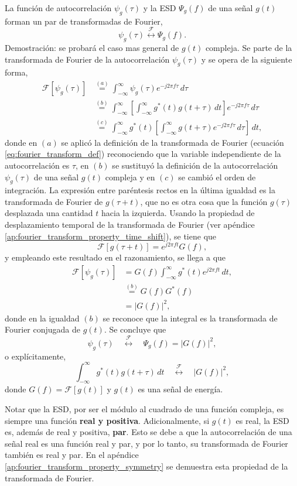 \documentclass[a4paper]{article}
\begin{document}
La función de autocorrelación \(\psi_g(\tau)\) y la ESD \(\Psi_g(f)\) de una señal \(g(t)\) forman un par de transformadas de Fourier,
\[
\psi_g(\tau)\overset{\mathcal{F}}{\longleftrightarrow}\Psi_g(f).
\]
Demostración: se probará el caso mas general de \(g(t)\) compleja. Se parte de la transformada de Fourier de la autocorrelación \(\psi_g(\tau)\) y se opera de la siguiente forma,
\begin{align*}
 \mathcal{F}\left[\psi_g(\tau)\right] &\overset{(a)}{=} \int_{-\infty}^{\infty}\psi_g(\tau)e^{-j2\pi f\tau}\,d\tau\\
  &\overset{(b)}{=}\int_{-\infty}^{\infty}\left[\int_{-\infty}^{\infty}g^*(t)g(t+\tau)\,dt\right]e^{-j2\pi f\tau}\,d\tau\\
  &\overset{(c)}{=}\int_{-\infty}^{\infty}g^*(t)\left[\int_{-\infty}^{\infty}g(t+\tau)e^{-j2\pi f\tau}\,d\tau\right]\,dt,
\end{align*}
donde en \((a)\) se aplicó la definición de la transformada de Fourier (ecuación \ref{eq:fourier_transform_def}) reconociendo que la variable independiente de la autocorrelación es \(\tau\), en \((b)\) se sustituyó la definición de la autocorrelación \(\psi_g(\tau)\) de una señal \(g(t)\) compleja y en \((c)\) se cambió el orden de integración. La expresión entre paréntesis rectos en la última igualdad es la transformada de Fourier de \(g(\tau+t)\), que no es otra cosa que la función \(g(\tau)\) desplazada una cantidad \(t\) hacia la izquierda. Usando la propiedad de desplazamiento temporal de la transformada de Fourier (ver apéndice \ref{ap:fourier_transform_property_time_shift}), se tiene que
\[
 \mathcal{F}\left[g(\tau+t)\right] = e^{j2\pi ft}G(f),
\]
y empleando este resultado en el razonamiento, se llega a que
\begin{align*}
 \mathcal{F}\left[\psi_g(\tau)\right] & = G(f)\int_{-\infty}^{\infty}g^*(t)e^{j2\pi ft}\,dt,\\ 
  &\overset{(b)}{=}G(f)G^*(f)\\
  & = |G(f)|^2,
\end{align*}
donde en la igualdad \((b)\) se reconoce que la integral es la transformada de Fourier conjugada de \(g(t)\). Se concluye que
\[
 \psi_g(\tau)\quad\overset{\mathcal{F}}{\longleftrightarrow}\quad\Psi_g(f)=|G(f)|^2,
\]
o explícitamente,
\[
 \int_{-\infty}^{\infty}g^*(t)g(t+\tau)\,dt\quad\overset{\mathcal{F}}{\longleftrightarrow}\quad|G(f)|^2,
\]
donde \(G(f)=\mathcal{F}\left[g(t)\right]\) y \(g(t)\) es una señal de energía.

Notar que la ESD, por ser el módulo al cuadrado de una función compleja, es siempre una función \textbf{real y positiva}. Adicionalmente, si \(g(t)\) es real, la ESD es, además de real y positiva, \textbf{par}. Esto se debe a que la autocorrelación de una señal real es una función real y par, y por lo tanto, su transformada de Fourier también es real y par.  En el apéndice \ref{ap:fourier_transform_property_symmetry} se demuestra esta propiedad de la transformada de Fourier.
\end{document}
